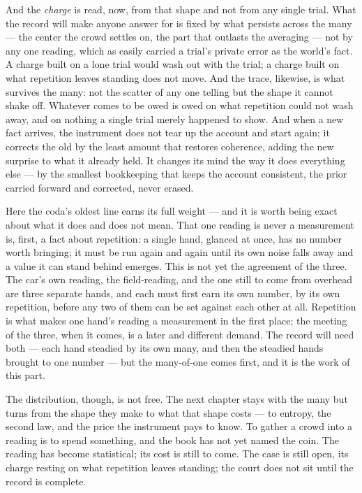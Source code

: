 And the \emph{charge} is read, now, from that shape and not from any single trial. What the record will make
anyone answer for is fixed by what persists across the many --- the center the crowd settles on, the part that
outlasts the averaging --- not by any one reading, which as easily carried a trial's private error as the
world's fact. A charge built on a lone trial would wash out with the trial; a charge built on what repetition
leaves standing does not move. And the trace, likewise, is what survives the many: not the scatter of any one
telling but the shape it cannot shake off. Whatever comes to be owed is owed on what repetition could not wash
away, and on nothing a single trial merely happened to show. And when a new fact arrives, the instrument does
not tear up the account and start again; it corrects the old by the least amount that restores coherence, adding
the new surprise to what it already held. It changes its mind the way it does everything else --- by the
smallest bookkeeping that keeps the account consistent, the prior carried forward and corrected, never erased.

Here the coda's oldest line earns its full weight --- and it is worth being exact about what it does and does
not mean. That one reading is never a measurement is, first, a fact about repetition: a single hand, glanced at
once, has no number worth bringing; it must be run again and again until its own noise falls away and a value it
can stand behind emerges. This is not yet the agreement of the three. The car's own reading, the field-reading,
and the one still to come from overhead are three separate hands, and each must first earn its own number, by
its own repetition, before any two of them can be set against each other at all. Repetition is what makes one
hand's reading a measurement in the first place; the meeting of the three, when it comes, is a later and
different demand. The record will need both --- each hand steadied by its own many, and then the steadied hands
brought to one number --- but the many-of-one comes first, and it is the work of this part.

The distribution, though, is not free. The next chapter stays with the many but turns from the shape they make
to what that shape costs --- to entropy, the second law, and the price the instrument pays to know. To gather a
crowd into a reading is to spend something, and the book has not yet named the coin. The reading has become
statistical; its cost is still to come. The case is still open, its charge resting on what repetition leaves
standing; the court does not sit until the record is complete.

